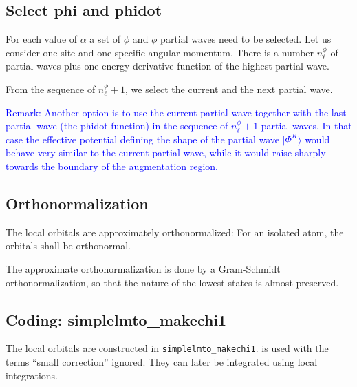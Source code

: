 \documentclass[11pt,a4paper]{report}
\begin{document}
\subsection{Select phi and phidot}

For each value of $\alpha$ a set of $\phi$ and $\dot{\phi}$ partial
waves need to be selected. Let us consider one site and one specific
angular momentum. There is a number $n^\phi_\ell$ of partial waves
plus one energy derivative function of the highest partial wave.

From the sequence of $n^\phi_\ell+1$, we select the current and the
next partial wave. 

\textcolor{blue}{Remark: Another option is to use the current partial
  wave together with the last partial wave (the phidot function) in
  the sequence of $n^\phi_\ell+1$ partial waves. In that case the
  effective potential defining the shape of the partial wave
  $|\Phi^K\rangle$ would behave very similar to the current partial
  wave, while it would raise sharply towards the boundary of the
  augmentation region.}

\subsection{Orthonormalization}
The local orbitals are approximately orthonormalized: For an isolated
atom, the orbitals shall be orthonormal.

The approximate orthonormalization is done by a Gram-Schmidt
orthonormalization, so that the nature of the lowest states is almost
preserved.



\subsection{Coding: simplelmto\_makechi1}
The local orbitals are constructed in \verb|simplelmto_makechi1|.
 is used with the terms ``small correction''
ignored. They can later be integrated using local integrations.
\end{document}
